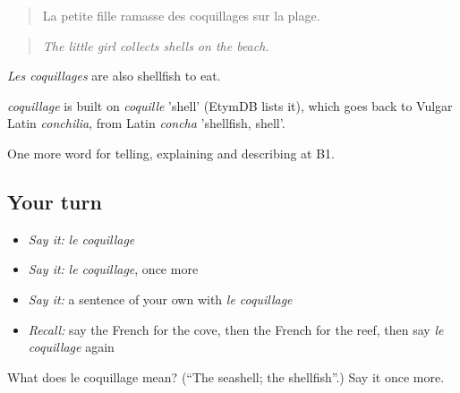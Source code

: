 \begin{quote}
La petite fille ramasse des coquillages sur la plage.
\end{quote}

\begin{quote}
\emph{The little girl collects shells on the beach.}
\end{quote}

\emph{Les coquillages} are also shellfish to eat.

\begin{cousinweb}
\emph{coquillage} is built on \emph{coquille} 'shell' (EtymDB lists it), which goes back to Vulgar Latin \emph{conchilia}, from Latin \emph{concha} 'shellfish, shell'.
\end{cousinweb}

\begin{grammarlens}[title={What you've built}]
One more word for telling, explaining and describing at B1.
\end{grammarlens}

\subsection*{Your turn}
\begin{itemize}
\raggedright
  \item \emph{Say it:} \emph{le coquillage}
  \item \emph{Say it:} \emph{le coquillage}, once more
  \item \emph{Say it:} a sentence of your own with \emph{le coquillage}
  \item \emph{Recall:} say the French for the cove, then the French for the reef, then say \emph{le coquillage} again
\end{itemize}

\begin{tcolorbox}[breakable,colback=teal!4,colframe=teal!35!black,title={Before you move on}]
What does le coquillage mean? (\textquotedblleft{}The seashell; the shellfish\textquotedblright{}.) Say it once more.
\end{tcolorbox}

